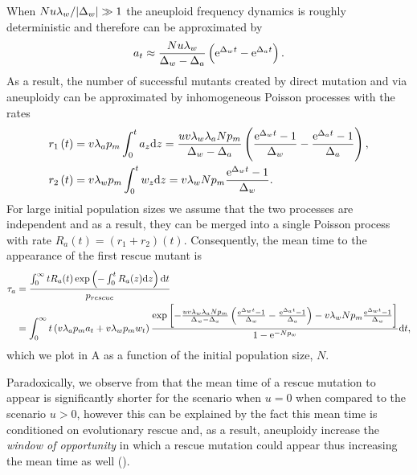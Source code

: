 \documentclass[12pt]{extarticle}
\renewcommand{\d}[1]{\ensuremath{\operatorname{d}\!{#1}}}
\renewcommand{\d}{{\rm d}}
\newcommand{\e}{{\rm e}}
\begin{document}
\begin{appendices}
When $Nu\lambda_w/\abs{\Delta_w}\gg1$ the aneuploid frequency dynamics is roughly deterministic and therefore can be approximated by 
\begin{equation}\label{aneuploidpopeq}
a_t \approx \frac{Nu\lambda_w}{\Delta_w-\Delta_a}\left(\e^{\Delta_wt}-\e^{\Delta_a t}\right).
\end{equation}
As a result, the number of successful mutants created by direct mutation and via aneuploidy can be approximated by inhomogeneous Poisson processes with the rates
\begin{align}\label{eq:twosteplineage}
r_1\left(t\right)&=v\lambda_ap_m\int_0^ta_{z} \d z = \frac{uv\lambda_w\lambda_aNp_m}{\Delta_w-\Delta_a}\left(\frac{\e^{\Delta_wt}-1}{\Delta_w}-\frac{\e^{\Delta_at}-1}{\Delta_a}\right),\\ \label{eq:twosteplineagedirect}
r_2\left(t\right)&=v\lambda_wp_m\int_0^tw_{z} \d z = v\lambda_wNp_m\frac{\e^{\Delta_w t}-1}{\Delta_w}.
\end{align}
For large initial population sizes we assume that the two processes are independent and as a result, they can be merged into a single Poisson process with rate $R_a(t)=\left(r_1+r_2\right)\left(t\right)$.
Consequently, the mean time to the appearance of the first rescue mutant is
\begin{align}\nonumber
\tau_a &= \frac{\int_{0}^{\infty}{tR_a(t)\exp\left(-\int_0^{t}{R_a(z)\d z}\right) \d t}}{p_{rescue}}\\ \label{meantimet2}
&=
\int_0^\infty t\left(v\lambda_ap_ma_t+v\lambda_wp_mw_t\right)\frac{\exp\left[-\frac{uv\lambda_w\lambda_aNp_m}{\Delta_w-\Delta_a}\left(\frac{\e^{\Delta_w t}-1}{\Delta_w}-\frac{\e^{\Delta_a t}-1}{\Delta_a}\right)-v\lambda_wNp_m\frac{\e^{\Delta_w t}-1}{\Delta_w}\right] }{1-\e^{-Np_w}}\d t,
\end{align}
which we plot in A as a function of the initial population size, $N$.

Paradoxically, we observe from  that the mean time of a rescue mutation to appear is significantly shorter for the scenario when $u=0$ when compared to the scenario $u>0$, however this can be explained by the fact this mean time is conditioned on evolutionary rescue and, as a result, aneuploidy increase the \emph{window of opportunity} in which a rescue mutation could appear thus increasing the mean time as well ().


\end{appendices}
\end{document}
